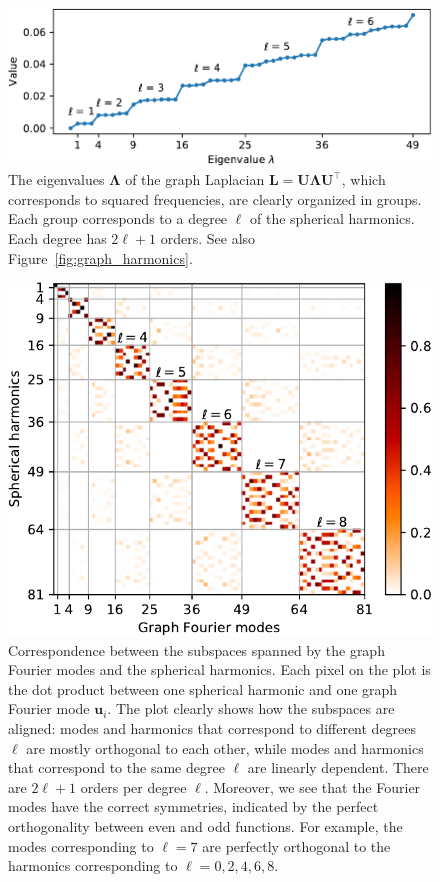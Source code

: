 \documentclass[final,twocolumn,3p,times,sort&compress]{elsarticle}
\newcommand{\figref}[1]{Figure~\ref{fig:#1}}
\renewcommand{\b}[1]{{\bm{#1}}}   %
\newcommand{\1}{\b{1}}              %
\newcommand{\0}{\b{0}}              %
\renewcommand{\L}{\b{L}}
\newcommand{\U}{\b{U}}
\newcommand{\trans}{^\intercal}
\newcommand{\bLambda}{\b{\Lambda}}
\begin{document}
\begin{figure}[ht!]
	\centering
	\includegraphics[width=\linewidth]{graph_eigenvalues}
	\caption{The eigenvalues $\bLambda$ of the graph Laplacian $\L = \U \bLambda \U\trans$, which corresponds to squared frequencies, are clearly organized in groups. Each group corresponds to a degree $\ell$ of the spherical harmonics. Each degree has $2\ell + 1$ orders. See also \figref{graph_harmonics}.}
	\label{fig:graph_eigenvalues}
\end{figure}

\begin{figure}[ht!]
	\centering
	\includegraphics[width=\linewidth]{subspace_harmonics_eigenvectors}
	\caption{Correspondence between the subspaces spanned by the graph Fourier modes and the spherical harmonics. Each pixel on the plot is the dot product between one spherical harmonic and one graph Fourier mode $\b u_i$. The plot clearly shows how the subspaces are aligned: modes and harmonics that correspond to different degrees $\ell$ are mostly orthogonal to each other, while modes and harmonics that correspond to the same degree $\ell$ are linearly dependent. There are $2 \ell + 1$ orders per degree $\ell$. Moreover, we see that the Fourier modes have the correct symmetries, indicated by the perfect orthogonality between even and odd functions. For example, the modes corresponding to $\ell=7$ are perfectly orthogonal to the harmonics corresponding to $\ell=0,2,4,6,8$.}
	\label{fig:subspace_harmonics_eigenvectors}
\end{figure}
\end{document}

